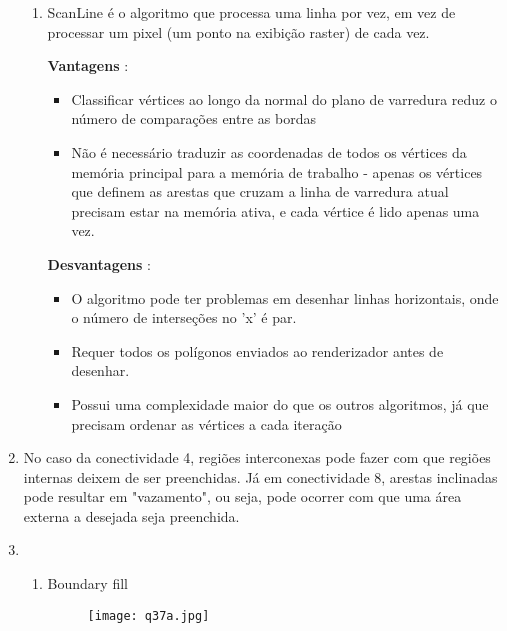 \begin{enumerate}[label=\arabic*)]
\begin{enumerate}[label=\alph*.]
		\item ScanLine é o algoritmo que processa uma linha por vez, em vez de processar um pixel (um ponto na exibição raster) de cada vez.
		
		\textbf{Vantagens} : 
		\begin{itemize}
			\item Classificar vértices ao longo da normal do plano de varredura reduz o número de comparações entre as bordas
			\item Não é necessário traduzir as coordenadas de todos os vértices da memória principal para a memória de trabalho - apenas os vértices que definem as arestas que cruzam a linha de varredura atual precisam estar na memória ativa, e cada vértice é lido apenas uma vez.
		\end{itemize}
		
		\textbf{Desvantagens} : 
		
				\begin{itemize}
					\item O algoritmo pode ter problemas em desenhar linhas horizontais, onde o
					número de interseções no 'x' é par.
					\item Requer todos os polígonos enviados ao renderizador antes de desenhar.
					\item Possui uma complexidade maior do que os outros algoritmos, já que
					precisam ordenar as vértices a cada iteração
				\end{itemize}

 	\end{enumerate}
 	
 	\item  No caso da conectividade 4, regiões interconexas pode fazer com que regiões internas 
 	deixem de ser preenchidas. Já em conectividade 8, arestas inclinadas pode resultar em 
 	"vazamento", ou seja, pode ocorrer com que uma área externa a desejada seja preenchida.
 	
 	\item 
 	
 	        \begin{enumerate}[label=\alph*.]
					\setlength\itemsep{1em}
		
					\item Boundary fill 
		
 					 \begin{figure}[ht]
      						\centering
      						\texttt{[image: q37a.jpg]}
  					\end{figure}
  					

\end{enumerate}
\end{enumerate}
